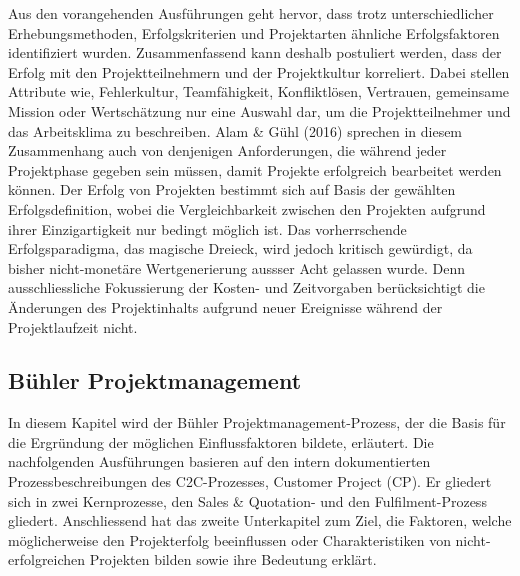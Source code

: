 \newline Aus den vorangehenden Ausführungen geht hervor, dass trotz unterschiedlicher Erhebungsmethoden, Erfolgskriterien und Projektarten ähnliche Erfolgsfaktoren identifiziert wurden. Zusammenfassend kann deshalb postuliert werden, dass der Erfolg mit den Projektteilnehmern und der Projektkultur korreliert. Dabei stellen Attribute wie, Fehlerkultur, Teamfähigkeit, Konfliktlösen, Vertrauen, gemeinsame Mission oder Wertschätzung nur eine Auswahl dar, um die Projektteilnehmer und das Arbeitsklima zu beschreiben. Alam \& Gühl (2016) sprechen in diesem Zusammenhang auch von denjenigen Anforderungen, die während jeder Projektphase gegeben sein müssen, damit Projekte erfolgreich bearbeitet werden können. Der Erfolg von Projekten bestimmt sich auf Basis der gewählten Erfolgsdefinition, wobei die Vergleichbarkeit zwischen den Projekten aufgrund ihrer Einzigartigkeit nur bedingt möglich ist. Das vorherrschende Erfolgsparadigma, das magische Dreieck, wird jedoch kritisch gewürdigt, da bisher nicht-monetäre Wertgenerierung aussser Acht gelassen wurde. Denn ausschliessliche Fokussierung der Kosten- und Zeitvorgaben berücksichtigt die Änderungen des Projektinhalts aufgrund neuer Ereignisse während der Projektlaufzeit  nicht.
\subsection{Bühler Projektmanagement}
In diesem Kapitel wird der Bühler Projektmanagement-Prozess, der die Basis für die Ergründung der möglichen Einflussfaktoren bildete, erläutert. Die nachfolgenden Ausführungen basieren auf den intern dokumentierten Prozessbeschreibungen des C2C-Prozesses, Customer Project (CP). Er gliedert sich in zwei Kernprozesse, den Sales \& Quotation- und den Fulfilment-Prozess gliedert. Anschliessend hat das zweite Unterkapitel zum Ziel, die Faktoren, welche möglicherweise den Projekterfolg beeinflussen oder Charakteristiken von nicht-erfolgreichen Projekten bilden sowie ihre Bedeutung erklärt.

